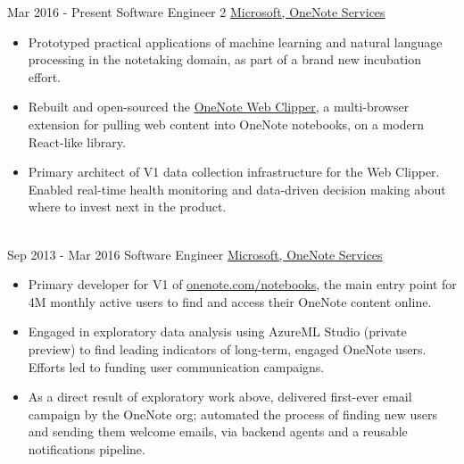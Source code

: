 \documentclass[letterpaper]{twentysecondcv} %
\begin{document}
\begin{twenty} %
\twentyitem
    	{Mar 2016 -}
		{Present}
        {Software Engineer 2}
        {\href{http://www.onenote.com/}{Microsoft, OneNote Services}}
        {}
        {
        {\begin{itemize} \itemsep -2pt %
        \item Prototyped practical applications of machine learning and natural language processing in the notetaking domain, as part of a brand new incubation effort.
        \item Rebuilt and open-sourced the \href{https://github.com/OneNoteDev/WebClipper/wiki}{OneNote Web Clipper}, a multi-browser extension for pulling web content into OneNote notebooks, on a modern React-like library.
        \item Primary architect of V1 data collection infrastructure for the Web Clipper. Enabled real-time health monitoring and data-driven decision making about where to invest next in the product.
    \end{itemize}}
        }
    \\
	\twentyitem
    	{Sep 2013 -}
		{Mar 2016}
        {Software Engineer}
        {\href{http://www.onenote.com/}{Microsoft, OneNote Services}}
        {}
        {
        {\begin{itemize} \itemsep -2pt %
        \item Primary developer for V1 of \href{https://www.onenote.com/notebooks}{onenote.com/notebooks}, the main entry point for 4M monthly active users to find and access their OneNote content online.
        \item Engaged in exploratory data analysis using AzureML Studio (private preview) to find leading indicators of long-term, engaged OneNote users. Efforts led to funding user communication campaigns.
        \item As a direct result of exploratory work above, delivered first-ever email campaign by the OneNote org; automated the process of finding new users and sending them welcome emails, via backend agents and a reusable notifications pipeline.
    \end{itemize}}
        }

\end{twenty}

\end{document}
